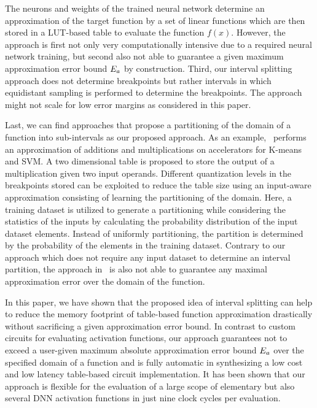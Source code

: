 {The neurons and weights of the trained neural network determine an approximation of the target function by a set of linear functions which are then stored in a LUT-based table to evaluate the function $f(x)$.
However, the approach is first not only very computationally intensive due to a required neural network training, but second also not able to guarantee a given maximum approximation error bound $E_a$ by construction.
Third, our interval splitting approach does not determine breakpoints but rather intervals in which equidistant sampling is performed to determine the breakpoints. 
The approach~\cite{Yu:2022} might not scale for low error margins as considered in this paper.\par
Last, we can find approaches that propose a partitioning of the domain of a function into sub-intervals as our proposed approach.
As an example,~\cite{Raha} performs an approximation of additions and multiplications on accelerators for K-means and \ac{SVM}. 
A two dimensional table is proposed to store the output of a multiplication given two input operands. 
Different quantization levels in the breakpoints stored can be exploited to reduce the table size using an input-aware approximation consisting of learning the partitioning of the domain. 
Here, a training dataset is utilized to generate a partitioning while considering the statistics of the inputs by calculating the probability distribution of the input dataset elements. 
Instead of uniformly partitioning, the partition is determined by the probability of the elements in the training dataset.
Contrary to our approach which does not require any input dataset to determine an interval partition, the approach in~\cite{Raha} is also not able to guarantee any maximal approximation error over the domain of the function.\par}
In this paper, we have shown that the proposed idea of interval splitting can help to reduce the memory footprint of table-based function approximation drastically without sacrificing {a given approximation error bound}.
{In contrast to custom circuits for evaluating activation functions, our approach guarantees not to exceed a user-given maximum absolute approximation error bound $E_a$ over the specified domain of a function and is fully automatic in synthesizing a low cost and low latency table-based circuit implementation.
It has been shown that our approach is flexible for the evaluation of a large scope of elementary but also several \ac{DNN}  activation functions in just nine clock cycles per evaluation.}
